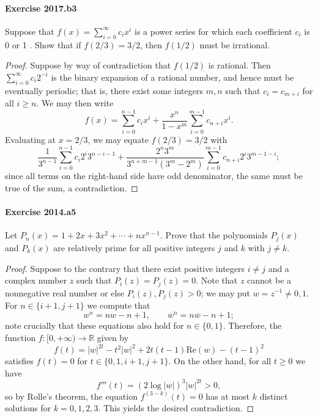 \documentclass{article}
\begin{document}
\paragraph{Exercise 2017.b3} Suppose that $f(x)=\sum_{i=0}^{\infty} c_{i} x^{i}$ is a power series for which each coefficient $c_{i}$ is 0 or 1 . Show that if $f(2 / 3)=3 / 2$, then $f(1 / 2)$ must be irrational.
\begin{proof}
    Suppose by way of contradiction that $f(1/2)$ is rational. Then $\sum_{i=0}^{\infty} c_i 2^{-i}$ is the binary expansion of a rational number, and hence must be eventually periodic; that is, there exist some integers $m,n$ such that
$c_i = c_{m+i}$ for all $i \geq n$. We may then write
\[
f(x) = \sum_{i=0}^{n-1} c_i x^i + \frac{x^n}{1-x^m} \sum_{i=0}^{m-1} c_{n+i} x^i.
\]
Evaluating at $x = 2/3$, we may equate $f(2/3) = 3/2$ with 
\[
\frac{1}{3^{n-1}} \sum_{i=0}^{n-1} c_i 2^i 3^{n-i-1} + \frac{2^n 3^m}{3^{n+m-1}(3^m-2^m)} \sum_{i=0}^{m-1} c_{n+i} 2^i 3^{m-1-i};
\]
since all terms on the right-hand side have odd denominator, the same must be true of the sum, a contradiction.
\end{proof}



\paragraph{Exercise 2014.a5} Let
$P_n(x)=1+2 x+3 x^2+\cdots+n x^{n-1} .$ Prove that the polynomials $P_j(x)$ and $P_k(x)$ are relatively prime for all positive integers $j$ and $k$ with $j \neq k$.
\begin{proof}
    Suppose to the contrary that there exist positive integers $i \neq j$ and a complex number $z$ such that $P_i(z) = P_j(z) = 0$. Note that $z$ cannot be a nonnegative real number or else $P_i(z), P_j(z) > 0$; we may put $w = z^{-1} \neq 0,1$. For $n \in \{i+1,j+1\}$ we compute that
\[
w^n = n w - n + 1,
\qquad \overline{w}^n =  n \overline{w} - n + 1;
\]
note crucially that these equations also hold for $n \in \{0,1\}$.
Therefore, the function $f: [0, +\infty) \to \mathbb{R}$ given by
\[
f(t) = \left| w \right|^{2t} - t^2 \left| w \right|^2 + 2t(t-1)\mathrm{Re}(w) - (t-1)^2
\]
satisfies $f(t) = 0$ for $t \in \{0,1,i+1,j+1\}$. On the other hand, for all $t \geq 0$ we have
\[
f'''(t) = (2 \log \left| w \right|)^3 \left| w \right|^{2t} > 0,
\]
so by Rolle's theorem, the equation $f^{(3-k)}(t) = 0$ has at most $k$ distinct solutions for $k=0,1,2,3$. This yields the desired contradiction.
\end{proof}
\end{document}
